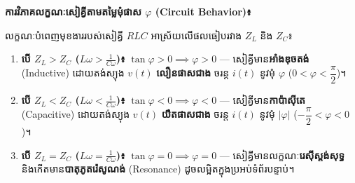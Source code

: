 \vspace{0.2em}
\noindent
\textbf{\textcolor{brownheader}{ការវិភាគលក្ខណៈសៀគ្វីតាមតម្លៃមុំផាស $\varphi$ ({\englishfont Circuit Behavior})៖}}
\par\vspace{1pt}
\noindent
លក្ខណៈបំពេញមុខងាររបស់សៀគ្វី $RLC$ អាស្រ័យលើផលធៀបរវាង $Z_L$ និង $Z_C$៖
\begin{enumerate}[label=\textbf{\arabic*.} ,itemsep=1.5pt, topsep=1.5pt, parsep=0pt, leftmargin=1.4em]
	\item \textbf{បើ $Z_L > Z_C$ ($L\omega > \frac{1}{C\omega}$)៖} $\tan\varphi > 0 \implies \varphi > 0$ — សៀគ្វីមាន\textbf{អាំងឌុចតង់} ({\englishfont Inductive}) ដោយតង់ស្យុង $v(t)$ \textbf{លឿនផាសជាង} ចរន្ត $i(t)$ នូវមុំ $\varphi$ ($0 < \varphi < \dfrac{\pi}{2}$)។
	\item \textbf{បើ $Z_L < Z_C$ ($L\omega < \frac{1}{C\omega}$)៖} $\tan\varphi < 0 \implies \varphi < 0$ — សៀគ្វីមាន\textbf{កាប៉ាសុីតេ} ({\englishfont Capacitive}) ដោយតង់ស្យុង $v(t)$ \textbf{យឺតផាសជាង} ចរន្ត $i(t)$ នូវមុំ $|\varphi|$ ($-\dfrac{\pi}{2} < \varphi < 0$)។
	\item \textbf{បើ $Z_L = Z_C$ ($L\omega = \frac{1}{C\omega}$)៖} $\tan\varphi = 0 \implies \varphi = 0$ — សៀគ្វីមានលក្ខណៈ\textbf{រេស៊ីស្តង់សុទ្ធ} និងកើតមាន\textbf{បាតុភូតរ៉េសូណង់} ({\englishfont Resonance}) ដូចលម្អិតក្នុងប្រអប់ទំព័របន្ទាប់។
\end{enumerate}

\clearpage

